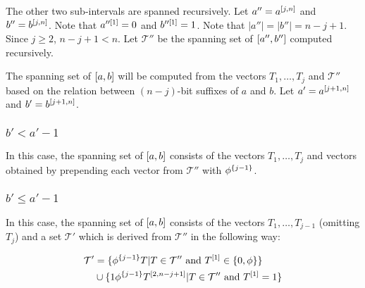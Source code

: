 The other two sub-intervals are spanned recursively.
Let $a'' = a^{[j, n]}$ and $b'' = b^{[j, n]}$.
Note that $a''^{[1]} = 0$ and $b''^{[1]} = 1$.
Note that $|a''| = |b''| = n - j + 1$.
Since $j \geq 2$, $n-j+1 < n$.
Let $\mathcal{T}''$ be the spanning set
of $[a'', b'']$ computed recursively.

The spanning set of $[a, b]$ will be computed
from the vectors $T_1, \ldots, T_j$ and $\mathcal{T}''$
based on the relation between $(n-j)$-bit suffixes of $a$
and $b$.
Let $a' = a^{[j+1, n]}$ and $b' = b^{[j+1, n]}$.

\subsubsection{\texorpdfstring
{$b' < a' - 1$}
{b' < a' - 1}
}

In this case,
the spanning set of $[a, b]$ consists
of the vectors $T_1, \ldots, T_j$ and vectors obtained
by prepending each vector from $\mathcal{T}''$ with
$\phi^{\{j-1\}}$.

\subsubsection{\texorpdfstring
{$b' \leq a' - 1$}
{b' >= a' - 1}
}

In this case,
the spanning set of $[a, b]$ consists
of the vectors $T_1, \ldots, T_{j-1}$ (omitting $T_j$)
and a set $\mathcal{T}'$ which is derived
from $\mathcal{T}''$
in the following way:

\begin{align*}
\mathcal{T}' &= \{
\phi^{\{j-1\}} T | T \in \mathcal{T}'' \text{ and }
T^{[1]} \in \{0, \phi\}
\} \\
&\cup \{
1 \phi^{\{j-1\}} T^{[2, n-j+1]} | T \in \mathcal{T}''
\text{ and } T^{[1]} = 1
\}
\end{align*}

